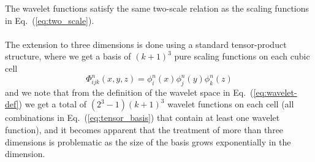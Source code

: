 The wavelet functions satisfy the same two-scale relation as the scaling functions 
in Eq.~(\ref{eq:two_scale}).
\\
\\
\noindent
The extension to three dimensions is done using a standard tensor-product structure, 
where we get a basis of $(k+1)^3$ pure scaling functions on each cubic cell 
\begin{equation}
    \label{eq:tensor_basis}
    \Phi^n_{ijk}(x,y,z) = \phi^n_i(x)\phi^n_j(y)\phi^n_k(z)
\end{equation}
and we note that from the definition of the wavelet space in Eq.~(\ref{eq:wavelet-def}) 
we get a total of $(2^3-1)(k+1)^3$ wavelet functions on each cell (all combinations in 
Eq.~(\ref{eq:tensor_basis}) that contain at least one wavelet function), and it becomes 
apparent that the treatment of more than three dimensions is problematic as the size of 
the basis grows exponentially in the dimension.


\pagebreak
